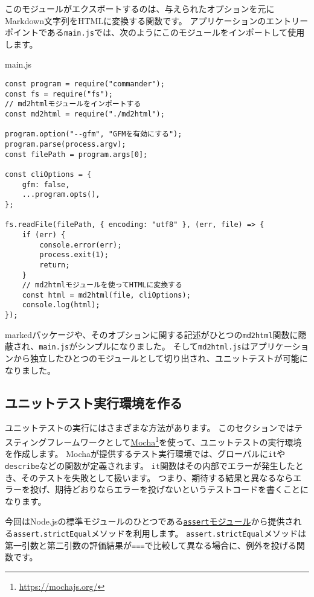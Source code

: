 このモジュールがエクスポートするのは、与えられたオプションを元にMarkdown文字列をHTMLに変換する関数です。
アプリケーションのエントリーポイントである\texttt{main.js}では、次のようにこのモジュールをインポートして使用します。

\begin{listtitle}
main.js
\end{listtitle}
\begin{lstlisting}
const program = require("commander");
const fs = require("fs");
// md2htmlモジュールをインポートする
const md2html = require("./md2html");

program.option("--gfm", "GFMを有効にする");
program.parse(process.argv);
const filePath = program.args[0];

const cliOptions = {
    gfm: false,
    ...program.opts(),
};

fs.readFile(filePath, { encoding: "utf8" }, (err, file) => {
    if (err) {
        console.error(err);
        process.exit(1);
        return;
    }
    // md2htmlモジュールを使ってHTMLに変換する
    const html = md2html(file, cliOptions);
    console.log(html);
});
\end{lstlisting}
\listend

markedパッケージや、そのオプションに関する記述がひとつの\texttt{md2html}関数に隠蔽され、\texttt{main.js}がシンプルになりました。
そして\texttt{md2html.js}はアプリケーションから独立したひとつのモジュールとして切り出され、ユニットテストが可能になりました。

\hypertarget{create-env}{%
\subsection{ユニットテスト実行環境を作る}\label{create-env}}

ユニットテストの実行にはさまざまな方法があります。
このセクションではテスティングフレームワークとして\href{https://mochajs.org/}{Mocha}\footnote{\url{https://mochajs.org/}}を使って、ユニットテストの実行環境を作成します。
Mochaが提供するテスト実行環境では、グローバルに\texttt{it}や\texttt{describe}などの関数が定義されます。
\texttt{it}関数はその内部でエラーが発生したとき、そのテストを失敗として扱います。
つまり、期待する結果と異なるならエラーを投げ、期待どおりならエラーを投げないというテストコードを書くことになります。

今回はNode.jsの標準モジュールのひとつである\href{https://nodejs.org/api/assert.html}{\texttt{assert}モジュール}から提供される\texttt{assert.strictEqual}メソッドを利用します。
\texttt{assert.strictEqual}メソッドは第一引数と第二引数の評価結果が\texttt{===}で比較して異なる場合に、例外を投げる関数です。

